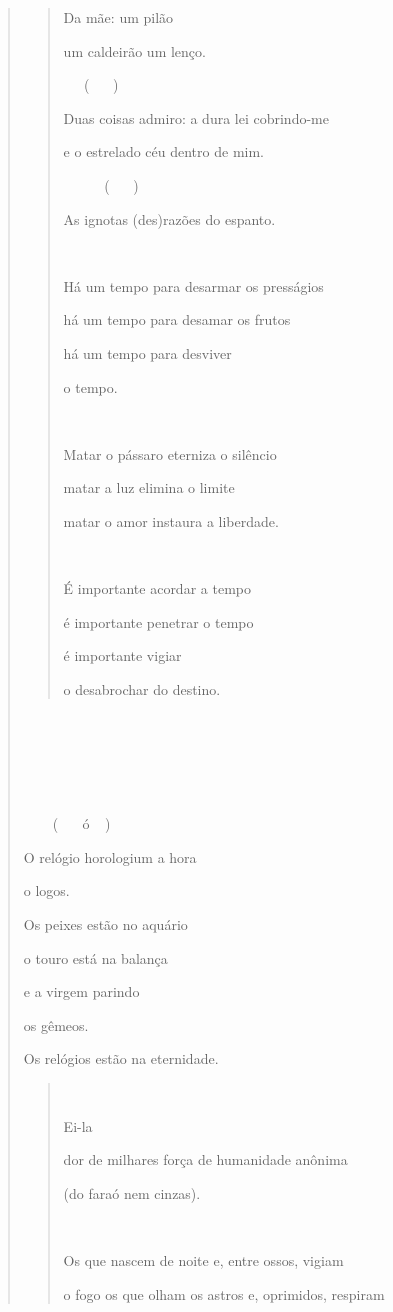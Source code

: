 \begin{verse}
\begin{quote}
Da mãe: um pilão

um caldeirão um lenço.

 ()

Duas coisas admiro: a dura lei cobrindo-me

e o estrelado céu dentro de mim.

  ()

As ignotas (des)razões do espanto.

 

Há um tempo para desarmar os presságios

há um tempo para desamar os frutos

há um tempo para desviver

o tempo.



Matar o pássaro eterniza o silêncio

matar a luz elimina o limite

matar o amor instaura a liberdade.



É importante acordar a tempo

é importante penetrar o tempo

é importante vigiar

o desabrochar do destino.
\end{quote}







  ( ó)

O relógio horologium a hora

o logos.

Os peixes estão no aquário

o touro está na balança

e a virgem parindo

os gêmeos.

Os relógios estão na eternidade.

\begin{quote}


Ei-la

dor de milhares força de humanidade anônima

(do faraó nem cinzas).



Os que nascem de noite e, entre ossos, vigiam

o fogo os que olham os astros e, oprimidos, respiram


\end{quote}
\end{verse}
